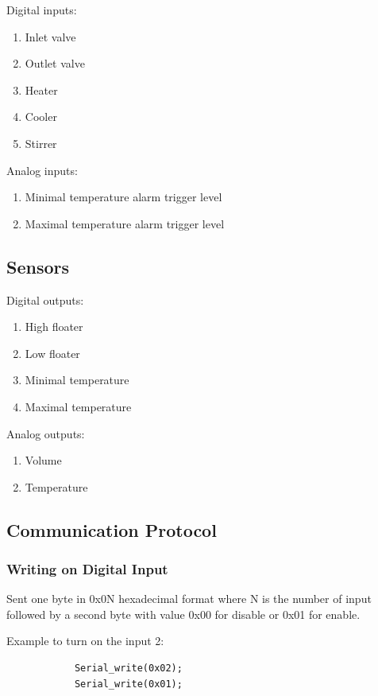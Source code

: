 Digital inputs:
\begin{enumerate}
\item Inlet valve
\item Outlet valve
\item Heater
\item Cooler
\item Stirrer
\end{enumerate}

Analog inputs:
\begin{enumerate}
\item Minimal temperature alarm trigger level
\item Maximal temperature alarm trigger level
\end{enumerate}

\subsection{Sensors}

Digital outputs:
\begin{enumerate}
\item High floater 
\item Low floater
\item Minimal temperature 
\item Maximal temperature
\end{enumerate}

Analog outputs:
\begin{enumerate}
\item Volume
\item Temperature
\end{enumerate}


\subsection{Communication Protocol}

\subsubsection{Writing on Digital Input}
Sent one byte in 0x0N hexadecimal format where N  is the number of input followed by a second byte with value 0x00 for disable or 0x01 for enable.  

Example to turn on the input 2:
\begin{verbatim}
            Serial_write(0x02);
            Serial_write(0x01);
\end{verbatim}


